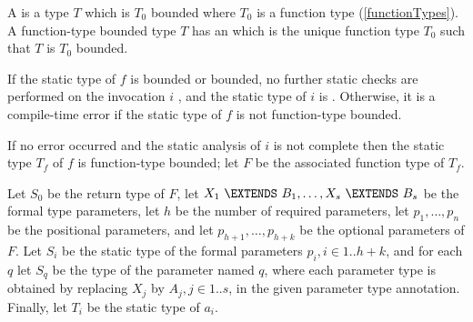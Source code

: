 \documentclass[makeidx]{article}
\begin{document}
{\LMHash{}%
A
is a type $T$ which is $T_0$ bounded where $T_0$ is a function type
(\ref{functionTypes}).
A function-type bounded type $T$ has an
which is the unique function type $T_0$ such that $T$ is $T_0$ bounded.

\LMHash{}%
If the static type of $f$ is \DYNAMIC{} bounded or \FUNCTION{} bounded,
no further static checks are performed on the invocation $i$
,
and the static type of $i$ is \DYNAMIC.
Otherwise, it is a compile-time error if the static type of $f$ is not
function-type bounded.

\LMHash{}%
If no error occurred and the static analysis of $i$ is not complete
then the static type $T_f$ of $f$ is function-type bounded;
let $F$ be the associated function type of $T_f$.

\LMHash{}%
Let $S_0$ be the return type of $F$,
let $X_1\ \EXTENDS\ B_1, \ldots, X_s\ \EXTENDS\ B_s$
be the formal type parameters,
let $h$ be the number of required parameters,
let $p_1, \ldots, p_n$ be the positional parameters,
and let $p_{h+1}, \ldots, p_{h+k}$ be the optional parameters of $F$.
Let $S_i$ be the static type of the formal parameters $p_i, i \in 1 .. h+k$,
and for each $q$ let $S_q$ be the type of the parameter named $q$,
where each parameter type is obtained by replacing $X_j$ by $A_j, j \in 1 .. s$,
in the given parameter type annotation.
Finally, let $T_i$ be the static type of $a_i$.


}
\end{document}
